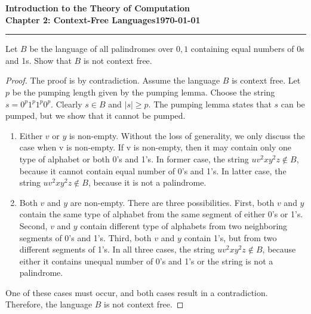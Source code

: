 \documentclass[11pt]{article}
\newcommand{\dated}{\today}
\begin{document}
\textbf{Introduction to the Theory of
Computation}\hfill\textbf{\myname}\\[0.01in]
\textbf{Chapter 2: Context-Free Languages}\hfill\textbf{\dated}\\
\smallskip\hrule\bigskip

\begin{problem}{2.31}
Let $B$ be the language of all palindromes over ${0,1}$ containing equal numbers of 0s and 1s. Show that $B$ is not context free.
\end{problem}

\begin{proof}
The proof is by contradiction. Assume the language $B$ is context free. Let $p$ be the pumping length given by the pumping lemma. Choose the string $s = 0^p1^p1^p0^p$. Clearly $s \in B$ and $|s| \geq p$. The pumping lemma states that $s$ can be pumped, but we show that it cannot be pumped.

\begin{enumerate}
\item Either $v$ or $y$ is non-empty. Without the loss of generality, we only discuss the case when v is non-empty. If v is non-empty, then it may contain only one type of alphabet or both 0’s and 1’s. In former case, the string $uv^2xy^2z \notin B$, because it cannot contain equal number of 0’s and 1’s. In latter case, the string $uv^2xy^2z \notin B$, because it is not a palindrome.
\item Both $v$ and $y$ are non-empty. There are three possibilities. First, both $v$ and $y$ contain the same type of alphabet from the same segment of either 0’s or 1’s. Second, $v$ and $y$ contain different type of alphabets from two neighboring segments of 0's and 1's. Third, both $v$ and $y$ contain 1's, but from two different segments of 1’s. In all three cases, the string $uv^2xy^2z \notin B$, because either it contains unequal number of 0's and 1's or the string is not a palindrome.
\end{enumerate}

One of these cases must occur, and both cases result in a contradiction. Therefore, the language $B$ is not context free.
\end{proof}
\end{document}
